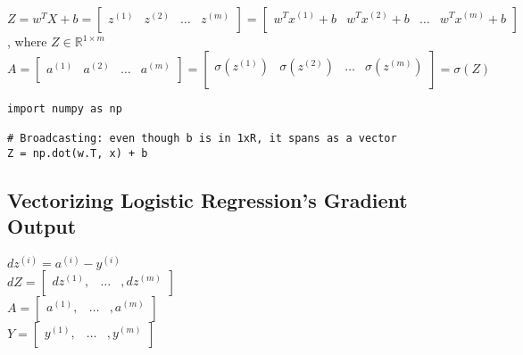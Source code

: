\documentclass{article}
\begin{document}
$Z =
w^T X +b =
\begin{bmatrix}
z^{(1)} & z^{(2)} & \dots & z^{(m)}\\
\end{bmatrix}
= \begin{bmatrix}
w^T x^{(1)} +b & w^T x^{(2)} +b & \dots & w^T x^{(m)} + b \\
\end{bmatrix}
$\\

, where $Z \in \mathbb{R}^{1 \times m}$\\

$A =
\begin{bmatrix}
a^{(1)} & a^{(2)} & \dots & a^{(m)}\\
\end{bmatrix}
=\begin{bmatrix}
\sigma(z^{(1)}) & \sigma(z^{(2)}) & \dots & \sigma(z^{(m)})\\
\end{bmatrix} = \sigma(Z)
$\\

\lstset{language=Python}
\begin{lstlisting}
import numpy as np

# Broadcasting: even though b is in 1xR, it spans as a vector
Z = np.dot(w.T, x) + b

\end{lstlisting}

\newpage
\subsection{Vectorizing Logistic Regression's Gradient Output}

$dz^{(i)} = a^{(i)}- y^{(i)}$\\
$dZ = \begin{bmatrix}
dz^{(1)}, & \dots & , dz^{(m)} \\
\end{bmatrix} $\\

$A = \begin{bmatrix}
a^{(1)}, & \dots & , a^{(m)} \\
\end{bmatrix} $\\

$Y = \begin{bmatrix}
y^{(1)}, & \dots & , y^{(m)} \\
\end{bmatrix} $\\
\end{document}
